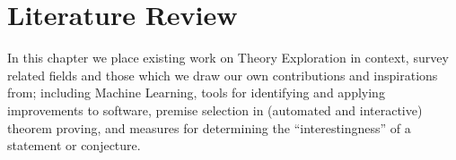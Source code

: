 \chapter{Literature Review}

In this chapter we place existing work on Theory Exploration in context, survey
related fields and those which we draw our own contributions and inspirations
from; including Machine Learning, tools for identifying and applying
improvements to software, premise selection in (automated and interactive)
theorem proving, and measures for determining the ``interestingness'' of a
statement or conjecture.







